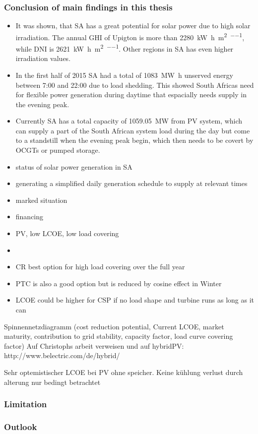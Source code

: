 \subsubsection{Conclusion of main findings in this thesis}
\begin{itemize}
\item It was shown, that SA has a great potential for solar power due to high solar irradiation. The annual GHI of Upigton is more than \SI{2280}{\kilo\watt\hour\per\square\metre\per\year}, while  DNI is \SI{2621}{\kilo\watt\hour\per\square\metre\per\year}. Other regions in SA has even higher irradiation values. 
\item In the first half of 2015 SA had a total of \SI{1083}{\mega\watt\hour} unserved energy between 7:00 and 22:00 due to load shedding. This showed South Africas need for flexible power generation during daytime that espacially needs supply in the evening peak. 
\item Currently SA has a total capacity of \SI{1059.05}{\mega\watt} from PV system, which can supply a part of the South African system load during the day but come to a standstill when the evening peak begin, which then needs to be covert by OCGTs or pumped storage.
\item status of solar power generation in SA
\item generating a simplified daily generation schedule to supply at relevant times 
\item marked situation
\item financing 
\item PV, low LCOE, low load covering
\item 
\item CR best option for high load covering over the full year
\item PTC is also a good option but is reduced by cosine effect in Winter
\item LCOE could be higher for CSP if no load shape and turbine runs as long as it can


\end{itemize}


Spinnennetzdiagramm (cost reduction potential, Current LCOE, market maturity, contribution to grid stability, capacity factor, load curve covering factor)
Auf Christophs arbeit verweisen und auf hybridPV:
http://www.belectric.com/de/hybrid/

Sehr optemistischer LCOE bei PV ohne speicher.
Keine kühlung 
verlust durch alterung nur bedingt betrachtet



\subsubsection{Limitation}

\subsubsection{Outlook}

%
%
\clearpage
